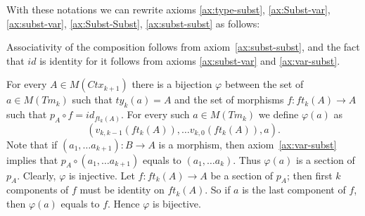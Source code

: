 \documentclass[reqno]{amsart}
\theoremstyle{definition}
\theoremstyle{remark}
\numberwithin{figure}{section}
\begin{document}
With these notations we can rewrite axioms \eqref{ax:type-subst}, \eqref{ax:Subst-var}, \eqref{ax:subst-var}, \eqref{ax:Subst-Subst}, \eqref{ax:subst-subst} as follows:
\begin{comment}
\begin{align}
\setcounter{equation}{\ref{ax:type-subst}}
\addtocounter{equation}{-1}
ty_n(a[f]) & = A[f] \\ \notag
\text{ for each } f : B \to ft_k(A) & \text{ where } A = ty_k(a) \\
A[id_{ft_n(A)}] & = A \\
a[id_{ft_n(ty_n(a))}] & = a \\
\setcounter{equation}{\ref{ax:Subst-Subst}}
\addtocounter{equation}{-1}
A[g][f] & = A[g \circ f] \\ \notag
\text{ for each } f : C \to B \text{ and } & g : B \to ft_m(A) \\
a[g][f] & = a[g \circ f] \\ \notag
\text{ for each } f : C \to B \text{ and } & g : B \to ft_m(ty_m(a))
\end{align}
\end{comment}

Associativity of the composition follows from axiom~\eqref{ax:subst-subst}, and the fact that $id$ is identity for it follows from axioms \eqref{ax:subst-var} and \eqref{ax:var-subst}.

For every $A \in M(Ctx_{k+1})$ there is a bijection $\varphi$ between the set of $a \in M(Tm_k)$ such that $ty_k(a) = A$ and the set of morphisms $f : ft_k(A) \to A$ such that $p_A \circ f = id_{ft_k(A)}$.
For every such $a \in M(Tm_k)$ we define $\varphi(a)$ as
\[ (v_{k,k-1}(ft_k(A)), \ldots v_{k,0}(ft_k(A)), a). \]
Note that if $(a_1, \ldots a_{k+1}) : B \to A$ is a morphism, then axiom~\eqref{ax:var-subst} implies that $p_A \circ (a_1, \ldots a_{k+1})$ equals to $(a_1, \ldots a_k)$.
Thus $\varphi(a)$ is a section of $p_A$.
Clearly, $\varphi$ is injective.
Let $f : ft_k(A) \to A$ be a section of $p_A$; then first $k$ components of $f$ must be identity on $ft_k(A)$.
So if $a$ is the last component of $f$, then $\varphi(a)$ equals to $f$.
Hence $\varphi$ is bijective.
\end{document}
